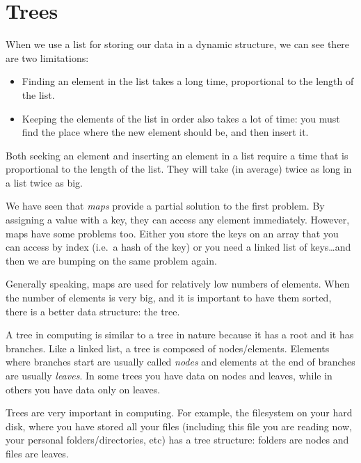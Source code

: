 
\section{Trees}
\label{sec:trees}

When we use a list for storing our data in a dynamic structure, we can
see there are two limitations: 

\begin{itemize}
\item Finding an element in the list takes a long time, proportional
  to the length of the list.
\item Keeping the elements of the list in order also takes a lot of
  time: you must find the place where the new element should be, and
  then insert it. 
\end{itemize}

Both seeking an element and inserting an element in a list require a
time that is proportional to the length of the list. They will take
(in average) twice as long in a list twice as big. 

We have seen that \emph{maps} provide a partial solution to the first
problem. By assigning a value with a key, they can access any element
immediately. However, maps have some problems too. Either you store
the keys on an array that you can access by index (i.e.~a hash of the
key) or you need a linked list of keys\ldots and then we are bumping
on the same problem again. 

Generally speaking, maps are used for relatively low numbers of
elements. When the number of elements is very big, and it 
is important to have them sorted, there is a better data structure:
the tree. 

A tree in computing is similar to a tree in nature because it has a
root and it has branches. Like a linked list, a tree is composed of
nodes/elements. Elements where branches start are usually called
\emph{nodes} and elements at the end of branches are usually
\emph{leaves}. In some trees you have data on nodes and leaves, while
in others you have data only on leaves. 

Trees are very important in computing. For example, the filesystem on
your hard disk, where you have stored all your files (including this
file you are reading now, your personal folders/directories, etc) has
a tree structure: folders are nodes and files are leaves.
